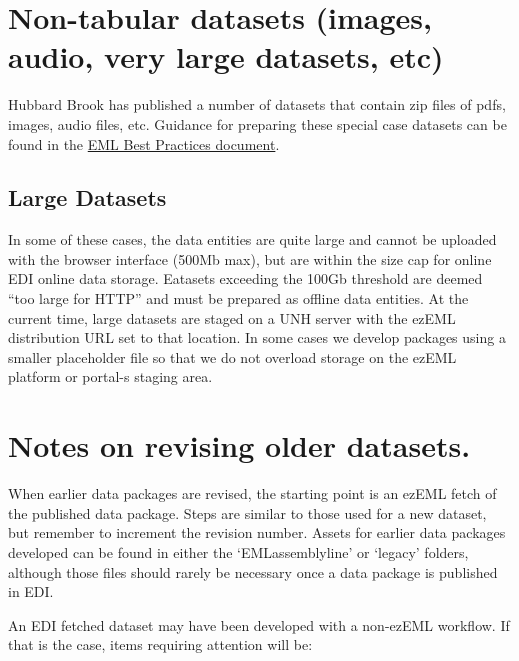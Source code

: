 \documentclass[
  letterpaper,
  DIV=11,
  numbers=noendperiod]{scrreprt}
\begin{document}
\section{Non-tabular datasets (images, audio, very large datasets,
etc)}\label{non-tabular-datasets-images-audio-very-large-datasets-etc}

Hubbard Brook has published a number of datasets that contain zip files
of pdfs, images, audio files, etc. Guidance for preparing these special
case datasets can be found in the
\href{https://ediorg.github.io/data-package-best-practices/data-package-design-for-special-cases.html}{EML
Best Practices document}.

\subsection{Large Datasets}\label{large-datasets}

In some of these cases, the data entities are quite large and cannot be
uploaded with the browser interface (500Mb max), but are within the size
cap for online EDI online data storage. Eatasets exceeding the 100Gb
threshold are deemed ``too large for HTTP'' and must be prepared as
offline data entities. At the current time, large datasets are staged on
a UNH server with the ezEML distribution URL set to that location. In
some cases we develop packages using a smaller placeholder file so that
we do not overload storage on the ezEML platform or portal-s staging
area.

\section{Notes on revising older
datasets.}\label{notes-on-revising-older-datasets.}

When earlier data packages are revised, the starting point is an ezEML
fetch of the published data package. Steps are similar to those used for
a new dataset, but remember to increment the revision number. Assets for
earlier data packages developed can be found in either the
`EMLassemblyline' or `legacy' folders, although those files should
rarely be necessary once a data package is published in EDI.

An EDI fetched dataset may have been developed with a non-ezEML
workflow. If that is the case, items requiring attention will be:
\end{document}
